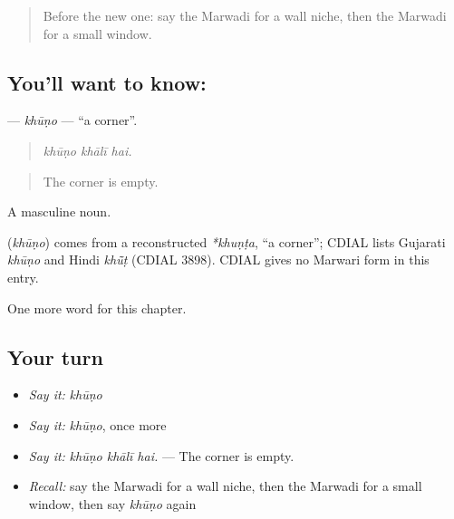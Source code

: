 \label{lesson:MW-C187-khuno}



\begin{quote}
Before the new one: say the Marwadi for a wall niche, then the Marwadi for a small window.
\end{quote}

\subsection*{You'll want to know: }
\textbf{} — \emph{khūṇo} — \textquotedblleft{}a corner\textquotedblright{}.

\begin{quote}
  
\end{quote}

\begin{quote}
\emph{khūṇo khālī hai.}
\end{quote}

\begin{quote}
The corner is empty.
\end{quote}

A masculine noun.

\begin{cousinweb}
\textbf{} (\emph{khūṇo}) comes from a reconstructed \emph{*khuṇṭa}, \textquotedblleft{}a corner\textquotedblright{}; CDIAL lists Gujarati \emph{khūṇo} and Hindi \emph{khū̃ṭ} (CDIAL 3898). CDIAL gives no Marwari form in this entry.
\end{cousinweb}

\begin{grammarlens}[title={What you've built}]
One more word for this chapter.
\end{grammarlens}

\subsection*{Your turn}
\begin{itemize}
\raggedright
  \item \emph{Say it:} \emph{khūṇo}
  \item \emph{Say it:} \emph{khūṇo}, once more
  \item \emph{Say it:} \emph{khūṇo khālī hai.} — The corner is empty.
  \item \emph{Recall:} say the Marwadi for a wall niche, then the Marwadi for a small window, then say \emph{khūṇo} again
\end{itemize}

